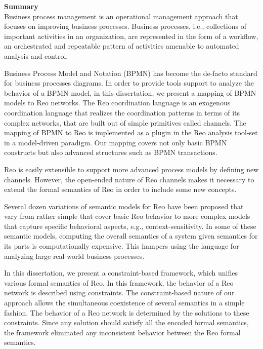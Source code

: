 \newpage
{\textbf{\Large{Summary}}}
\vspace*{1cm}
\\

 Business process management is an operational management 
approach that focuses on improving business processes. Business processes, i.e., collections of important activities in an organization, are 
represented in the form of a workflow, an orchestrated and repeatable 
pattern of activities amenable to automated analysis and control. 

Business Process Model and Notation (BPMN) has become the de-facto standard for business processes diagrams. In order to provide tools support to analyze the behavior of a BPMN model, in this dissertation, we present a mapping of BPMN models to Reo networks. The Reo coordination language is an exogenous coordination language that
realizes the coordination patterns in terms of its complex networks, that are built out of simple
primitives called channels.  The mapping of BPMN to Reo is implemented as a plugin in the Reo analysis tool-set in a model-driven paradigm. Our mapping covers not only basic BPMN constructs but also advanced structures such as BPMN transactions. 

Reo is easily extensible to support more advanced process models by defining new channels. 
However, the open-ended nature of Reo channels makes it necessary to extend the formal semantics of Reo in order to include some new concepts. 

Several dozen variations of semantic models for Reo have been proposed that vary from rather simple that cover basic Reo behavior to more complex models that capture specific behavioral aspects, e.g., context-sensitivity.  In some of these semantic models, computing the overall semantics of a system given  semantics for its parts is computationally expensive. This hampers using the language for analyzing large real-world business processes. 

In this dissertation, we present a constraint-based framework, which unifies various formal semantics of Reo. In this framework, the behavior of a Reo network is described using constraints. The constraint-based nature of our approach allows  the simultaneous coexistence of several semantics in a simple fashion. The behavior of a Reo network is determined by the solutions to these constraints. Since any solution should satisfy all the encoded formal semantics, the framework eliminated any inconsistent behavior between the Reo formal semantics.

